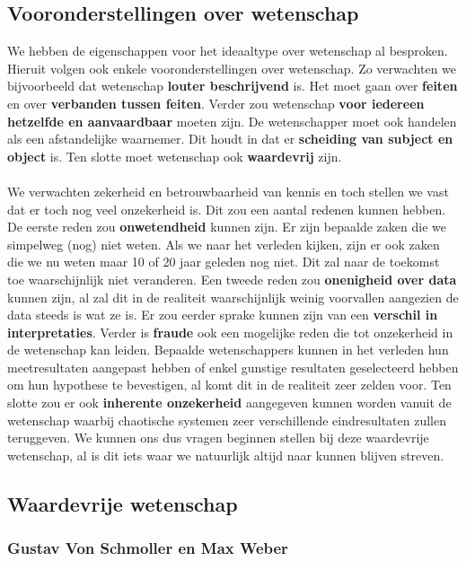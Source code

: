 \documentclass[../summary.tex]{subfiles}
\begin{document}
	\subsection{Vooronderstellingen over wetenschap}
	
	We hebben de eigenschappen voor het ideaaltype over wetenschap al besproken. Hieruit volgen ook enkele vooronderstellingen over wetenschap. Zo verwachten we bijvoorbeeld dat wetenschap \textbf{louter beschrijvend} is. Het moet gaan over \textbf{feiten} en over \textbf{verbanden tussen feiten}. Verder zou wetenschap \textbf{voor iedereen hetzelfde en aanvaardbaar} moeten zijn. De wetenschapper moet ook handelen als een afstandelijke waarnemer. Dit houdt in dat er \textbf{scheiding van subject en object} is. Ten slotte moet wetenschap ook \textbf{waardevrij} zijn.
	\\\\
	We verwachten zekerheid en betrouwbaarheid van kennis en toch stellen we vast dat er toch nog veel onzekerheid is. Dit zou een aantal redenen kunnen hebben. De eerste reden zou \textbf{onwetendheid} kunnen zijn. Er zijn bepaalde zaken die we simpelweg (nog) niet weten. Als we naar het verleden kijken, zijn er ook zaken die we nu weten maar 10 of 20 jaar geleden nog niet. Dit zal naar de toekomst toe waarschijnlijk niet veranderen. Een tweede reden zou \textbf{onenigheid over data} kunnen zijn, al zal dit in de realiteit waarschijnlijk weinig voorvallen aangezien de data steeds is wat ze is. Er zou eerder sprake kunnen zijn van een \textbf{verschil in interpretaties}. Verder is \textbf{fraude} ook een mogelijke reden die tot onzekerheid in de wetenschap kan leiden. Bepaalde wetenschappers kunnen in het verleden hun meetresultaten aangepast hebben of enkel gunstige resultaten geselecteerd hebben om hun hypothese te bevestigen, al komt dit in de realiteit zeer zelden voor. Ten slotte zou er ook \textbf{inherente onzekerheid} aangegeven kunnen worden vanuit de wetenschap waarbij chaotische systemen zeer verschillende eindresultaten zullen teruggeven. We kunnen ons dus vragen beginnen stellen bij deze waardevrije wetenschap, al is dit iets waar we natuurlijk altijd naar kunnen blijven streven.
	
	\subsection{Waardevrije wetenschap}
	
	\subsubsection{Gustav Von Schmoller en Max Weber}
	
\end{document}
